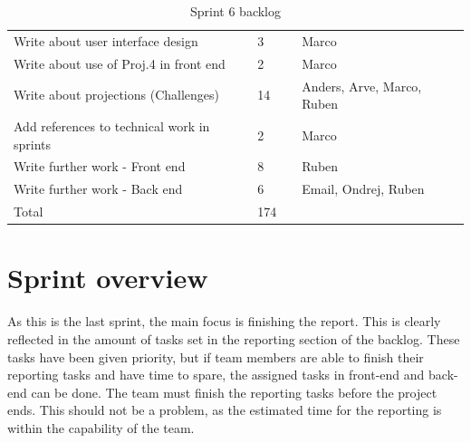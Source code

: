 \documentclass[11pt,a4paper,titlepage,oneside]{report}
\begin{document}
\begin{table}[h]
{\begin{tabular}{llll}
Write about user interface design                      & 3                                                                   &                                                         & Marco                      \\
Write about use of Proj.4 in front end                 & 2                                                                   &                                                         & Marco                      \\
Write about projections (Challenges)                   & 14                                                                  &                                                         & Anders, Arve, Marco, Ruben \\
Add references to technical work in sprints            & 2                                                                   &                                                         & Marco                      \\
Write further work - Front end                         & 8                                                                   &                                                         & Ruben                      \\
Write further work - Back end                          & 6                                                                   &                                                         & Email, Ondrej, Ruben       \\
\rowcolor[HTML]{C0C0C0} 
Total                                                  & 174                                                                 &                                                         &                           
\end{tabular}
}
\caption{Sprint 6 backlog}
\label{tab:Sprint6Backlog}
\end{table}

\section{Sprint overview}
As this is the last sprint, the main focus is finishing the report. This is clearly reflected in the amount of tasks set in the reporting section of the backlog. These tasks have been given priority, but if team members are able to finish their reporting tasks and have time to spare, the assigned tasks in \gls{front-end} and \gls{back-end} can be done. The team must finish the reporting tasks before the project ends. This should not be a problem, as the estimated time for the reporting is within the capability of the team.
\end{document}

